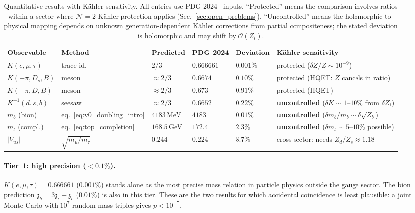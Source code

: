 \documentclass[aps,prd,twocolumn,showpacs,preprintnumbers,superscriptaddress,floatfix]{revtex4-2}
\newcommand{\MeV}{\,\mathrm{MeV}}
\newcommand{\GeV}{\,\mathrm{GeV}}
\newcommand{\zch}{\mathfrak{z}}
\begin{document}
\begin{table}
\centering\small
\begin{tabular}{llllll}
\hline
Observable & Method & Predicted & PDG 2024 & Deviation
  & K\"ahler sensitivity \\
\hline
$K(e,\mu,\tau)$ & trace id.\ & $2/3$ & $0.666661$
  & $0.001\%$ & protected ($\delta Z/Z \sim 10^{-9}$) \\
$K(-\pi,D_s,B)$ & meson & $\approx 2/3$ & $0.6674$
  & $0.10\%$ & protected (HQET: $Z$ cancels in ratio) \\
$K(-\pi,D,B)$ & meson & $\approx 2/3$ & $0.673$
  & $0.91\%$ & protected (HQET) \\
$K^{-1}(d,s,b)$ & seesaw & $\approx 2/3$ & $0.6652$
  & $0.22\%$ & \textbf{uncontrolled}
  ($\delta K \sim 1$--$10\%$ from $\delta Z_i$) \\
$m_b$ (bion) & eq.~\eqref{eq:v0_doubling_intro} & $4183\MeV$ & $4183$
  & $0.01\%$ & \textbf{uncontrolled}
  ($\delta m_b/m_b \sim \delta\sqrt{Z_b}$) \\
$m_t$ (compl.) & eq.~\eqref{eq:top_completion} & $168.5\GeV$ & $172.4$
  & $2.3\%$ & \textbf{uncontrolled}
  ($\delta m_t \sim 5$--$10\%$ possible) \\
$|V_{us}|$ & $\sqrt{m_\mu/m_\tau}$ & $0.244$ & $0.224$
  & $8.7\%$ & cross-sector: needs $Z_d/Z_s \approx 1.18$ \\
\hline
\end{tabular}
\caption{Quantitative results with K\"ahler sensitivity.
  All entries use PDG 2024~\cite{PDG:2024} inputs.
  ``Protected'' means the comparison involves ratios within a sector
  where $\mathcal{N}{=}2$ K\"ahler protection applies
  (Sec.~\ref{sec:open_problems}).
  ``Uncontrolled'' means the holomorphic-to-physical mapping
  depends on unknown generation-dependent K\"ahler corrections
  from partial compositeness; the stated deviation is holomorphic
  and may shift by $\mathcal{O}(Z_i)$.}
\label{tab:results}
\end{table}

\paragraph{Tier~1: high precision ($< 0.1\%$).}
$K(e,\mu,\tau) = 0.666661$ ($0.001\%$) stands alone as the
most precise mass relation in particle physics outside the
gauge sector.
The bion prediction $\zch_b = 3\zch_s + \zch_c$ ($0.01\%$) is
also in this tier.
These are the two results for which accidental coincidence is
least plausible: a joint Monte Carlo with $10^7$ random mass
triples gives $p < 10^{-7}$.
\end{document}
